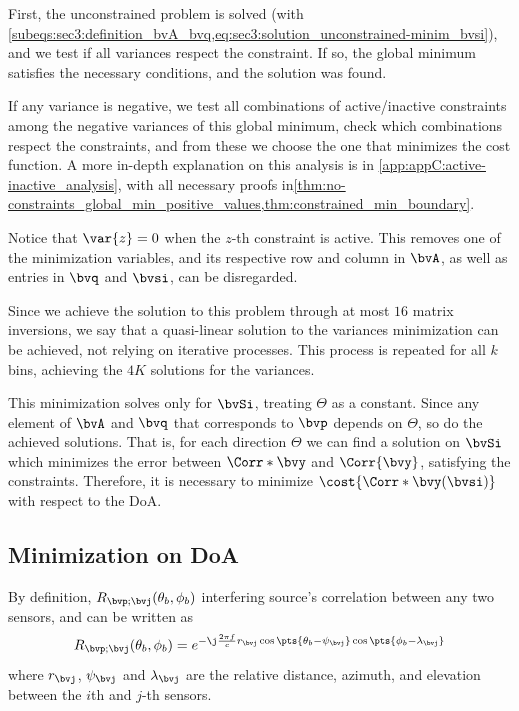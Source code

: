 First, the unconstrained problem is solved (with \cref{subeqs:sec3:definition_bvA_bvq,eq:sec3:solution_unconstrained-minim_bvsi}), and we test if all variances respect the constraint. If so, the global minimum satisfies the necessary conditions, and the solution was found.

If any variance is negative, we test all combinations of active/inactive constraints among the negative variances of this global minimum, check which combinations respect the constraints, and from these we choose the one that minimizes the cost function. A more in-depth explanation on this analysis is in \cref{app:appC:active-inactive_analysis}, with all necessary proofs in\cref{thm:no-constraints_global_min_positive_values,thm:constrained_min_boundary}.

Notice that $\var{z} = 0$ when the $z$-th constraint is active. This removes one of the minimization variables, and its respective row and column in $\bvA$, as well as entries in $\bvq$ and $\bvsi$, can be disregarded.

Since we achieve the solution to this problem through at most $16$ matrix inversions, we say that a quasi-linear solution to the variances minimization can be achieved, not relying on iterative processes. This process is repeated for all $k$ bins, achieving the $4K$ solutions for the variances.

This minimization solves only for $\bvSi$, treating $\Theta$ as a constant. Since any element of $\bvA$ and $\bvq$ that corresponds to $\bvp$ depends on $\Theta$, so do the achieved solutions. That is, for each direction $\Theta$ we can find a solution on $\bvSi$ which minimizes the error between $\Corr*{\bvy}$ and $\Corr{\bvy}$, satisfying the constraints. Therefore, it is necessary to minimize $\cost{\Corr*{\bvy}(\bvsi)}$ with respect to the DoA.

\subsection{Minimization on DoA}

By definition, $R_{\bvp;\bvj}(\theta_b,\phi_b)$ interfering source's correlation between any two sensors, and can be written as
\begin{equation}
	R_{\bvp;\bvj}(\theta_b,\phi_b) = e^{-\j \frac{2\pi f}{c} r_{\bvj} \cos\pts{\theta_b - \psi_{\bvj}} \cos\pts{\phi_b - \lambda_{\bvj}}}
\end{equation}
where $r_{\bvj}$, $\psi_{\bvj}$ and $\lambda_{\bvj}$ are the relative distance, azimuth, and elevation between the $i$th and $j$-th sensors.

